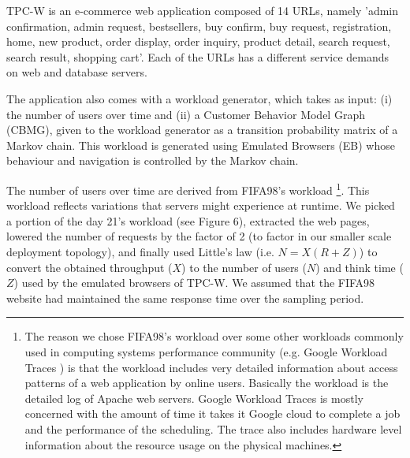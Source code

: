 TPC-W is an e-commerce web application composed of 14 URLs, namely 'admin confirmation, admin request, bestsellers, buy confirm, buy request, registration, home, new product, order display, order inquiry, product detail, search request, search result, shopping cart'.  Each of the URLs has a different service demands on web and database servers. 

The application also comes with a workload generator, which takes as input: (i) the number of users over time and (ii) a Customer Behavior Model Graph (CBMG), given to the workload generator as  a transition probability  matrix of a Markov chain. This workload is generated using Emulated Browsers (EB) whose behaviour and navigation is controlled by the Markov chain.  

The number of users over time are derived from FIFA98's workload \cite{arlitt_workload_2000}\footnote{The reason we chose FIFA98's workload over some other workloads commonly used in computing systems performance community (e.g. Google Workload Traces \cite{reiss2011google}) is that the workload includes very detailed information about access patterns of a web application by online users. Basically the workload is the detailed log of Apache web servers.
Google Workload Traces is mostly concerned with the amount of time it takes it Google cloud to complete a job and the performance of the scheduling. The trace also includes hardware level information about the resource usage on the physical machines. }.
This workload reflects variations that servers might experience at runtime. We picked a portion of the day 21's workload (see Figure 6), extracted the web pages, lowered the number of requests by the factor of 2 (to factor in our smaller scale deployment topology), and finally used Little's law \cite{little1961proof}  (i.e. $N=X(R+Z)$) to convert the obtained throughput ($X$) to the number of users ($N$) and think time ($Z$) used by the emulated browsers of TPC-W. We assumed that the FIFA98 website had maintained the same response time over the sampling period. %

